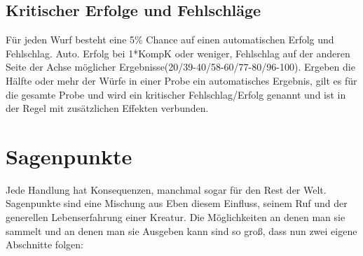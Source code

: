 \documentclass[a4paper,12pt,oneside]{book}
\begin{document}
\section{Kritischer Erfolge und Fehlschläge}
Für jeden Wurf besteht eine 5\% Chance auf einen automatischen Erfolg und Fehlschlag. Auto. Erfolg bei 1*KompK oder weniger, Fehlschlag auf der anderen Seite der Achse möglicher Ergebnisse(20/39-40/58-60/77-80/96-100). Ergeben die Hälfte oder mehr der Würfe in einer Probe ein automatisches Ergebnis, gilt es für die gesamte Probe und wird ein kritischer Fehlschlag/Erfolg genannt und ist in der Regel mit zusätzlichen Effekten verbunden.

\chapter{Sagenpunkte}
Jede Handlung hat Konsequenzen, manchmal sogar für den Rest der Welt. Sagenpunkte sind eine Mischung aus Eben diesem Einfluss, seinem Ruf und der generellen Lebenserfahrung einer Kreatur. Die Möglichkeiten an denen man sie sammelt und an denen man sie Ausgeben kann sind so groß, dass nun zwei eigene Abschnitte folgen:
\end{document}
